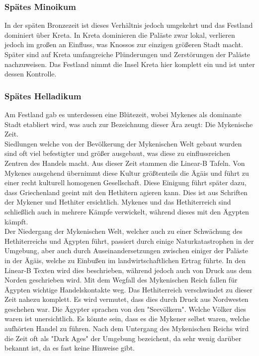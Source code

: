 \documentclass{article}
\begin{document}
	\subsubsection{Spätes Minoikum}
	In der späten Bronzezeit ist dieses Verhältnis jedoch umgekehrt und das Festland dominiert über Kreta. In Kreta dominieren die Paläste zwar lokal, verlieren jedoch im großen an Einfluss, was Knossos zur einzigen größeren Stadt macht. Später sind auf Kreta umfangreiche Plünderungen und Zerstörungen der Paläste nachzuweisen. Das Festland nimmt die Insel Kreta hier komplett ein und ist unter dessen Kontrolle. \\
	\subsubsection{Spätes Helladikum}
	Am Festland gab es unterdessen eine Blütezeit, wobei Mykenes als dominante Stadt etabliert wird, was auch zur Bezeichnung dieser Ära zeugt: Die Mykenische Zeit. \\
	Siedlungen welche von der Bevölkerung der Mykenischen Welt gebaut wurden sind oft viel befestigter und größer ausgebaut, was diese zu einflussreichen Zentren des Handels macht. Aus dieser Zeit stammen die Linear-B Tafeln. Von Mykenes ausgehend übernimmt diese Kultur größtenteils die Ägäis und führt zu einer recht kulturell homogenen Gesellschaft. Diese Einigung führt später dazu, dass Griechenland geeint mit den Hethitern agieren kann. Dies ist aus Schriften der Mykener und Hethiter ersichtlich. Mykenes und das Hethiterreich sind schließlich auch in mehrere Kämpfe verwickelt, während dieses mit den Ägypten kämpft. \\
	Der Niedergang der Mykenischen Welt, welcher auch zu einer Schwächung des Hethiterreichs und Ägypten führt, passiert durch einige Naturkatastrophen in der Umgebung, aber auch durch Auseinandersetzungen zwischen einiger der Paläste in der Ägäis, welche zu Einbußen im landwirtschaftlichen Ertrag führte. In den Linear-B Texten wird dies beschrieben, während jedoch auch von Druck aus dem Norden geschrieben wird. Mit dem Wegfall des Mykenischen Reich fallen für Ägypten wichtige Handelskontakte weg. Das Hethiterreich verschwindet zu dieser Zeit nahezu komplett. Es wird vermutet, dass dies durch Druck aus Nordwesten geschehen war. Die Ägypter sprachen von den "Seevölkern". Welche Völker dies waren ist unersichtlich. Es könnte sein, dass es die Mykener selbst waren, welche aufhörten Handel zu führen. Nach dem Untergang des Mykenischen Reichs wird die Zeit oft als "Dark Ages" der Umgebung bezeichent, da sehr wenig darüber bekannt ist, da es fast keine Hinweise gibt.
	
\end{document}
